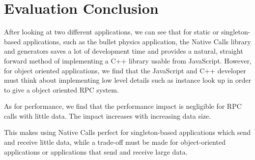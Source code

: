 \section{Evaluation Conclusion} %
\label{sec:eval_usability_conclusion}
After looking at two different applications, we can see that for static or singleton-based applications, such as the bullet physics application, the Native Calls library and generators saves a lot of development time and provides a natural, straight forward method of implementing a C++ library usable from JavaScript. However, for object oriented applications, we find that the JavaScript and C++ developer must think about implementing low level details such as instance look up in order to give a object oriented RPC system.

As for performance, we find that the performance impact is negligible for RPC calls with little data. The impact increases with increasing data size.

This makes using Native Calls perfect for singleton-based applications which send and receive little data, while a trade-off must be made for object-oriented applications or applications that send and receive large data.
